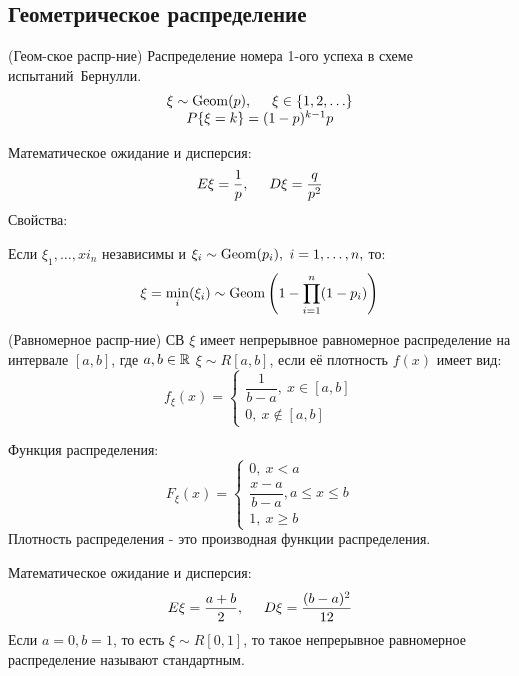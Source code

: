 \begin{multicols}{2}
    \subsection*{Геометрическое распределение}
    \begin{definition}{(Геом-ское распр-ние)}{}
        Распределение номера 1-ого успеха в схеме \mbox{испытаний Бернулли.}
        \[
        \begin{array}{c}
        \xi \sim \operatorname{Geom}(p), \hspace{0.5cm} \xi \in \{1,2, \ldots\} \\
        P\{\xi = k\} = (1-p)^{k - 1} p
        \end{array}
        \]
    \end{definition}
    Математическое ожидание и дисперсия:
    \[
    E\xi = \dfrac{1}{p}, \hspace{0.5cm} D\xi = \dfrac{q}{p^2}
    \]
    Свойства:
    \begin{enumerate*}
        \item Если $\xi_1, \ldots, xi_n$ независимы и $\xi_i \sim \operatorname{Geom}(p_i),$ $\mathmbox{i = 1, \ldots, n,}$ то:\useshortskip
        \[
        \xi = \min\limits_{i}(\xi_i) \sim \operatorname{Geom}\left(1 - \prod\limits_{i = 1}^{n}(1 - p_i) \right)
        \]
    \end{enumerate*}
    \begin{definition}{(Равномерное распр-ние)}{}
        СВ $\xi$ имеет непрерывное равномерное распределение на интервале $[a,b]$, где $a,b \in \mathbb{R}$ $\xi \sim R[a,b]$, если её плотность $f(x)$ имеет вид:
        \[
        f_\xi(x) = 
        \left\{ 
        \begin{array}{c}
             \dfrac{1}{b - a},\ x \in [a,b] \\[0.3cm]
             0,\ x \notin [a,b]
        \end{array}\right.
        \]
    \end{definition}
    Функция распределения:
    \[
    F_\xi(x) =
    \left\{ 
        \begin{array}{c}
             0,\ x < a \\[0.3cm]
             \dfrac{x - a}{b - a}, a \leq x \leq b \\ [0.3cm]
             1,\ x \geq b
        \end{array}\right.
    \]
    Плотность распределения - это производная функции распределения.
    \par
    Математическое ожидание и дисперсия:
    \[
    E\xi = \dfrac{a + b}{2}, \hspace{0.5cm} D\xi = \dfrac{(b - a)^2}{12}
    \]
    Если $a = 0, b = 1$, то есть $\xi \sim R[0,1]$, то такое непрерывное равномерное распределение называют стандартным.
    

\end{multicols}
